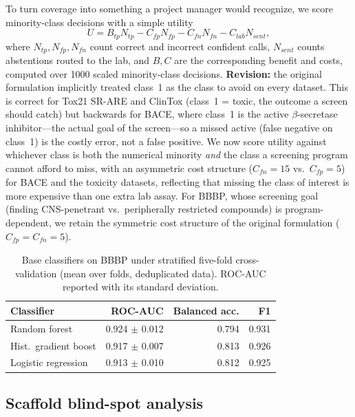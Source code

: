 \documentclass[11pt]{article}
\begin{document}
To turn coverage into something a project manager would recognize, we score minority-class
decisions with a simple utility
\begin{equation}
U = B_{tp} N_{tp} - C_{fp} N_{fp} - C_{fn} N_{fn} - C_{lab} N_{sent}, \label{eq:5}
\end{equation}
where $N_{tp}, N_{fp}, N_{fn}$ count correct and incorrect confident calls, $N_{sent}$ counts
abstentions routed to the lab, and $B, C$ are the corresponding benefit and costs, computed over
1000 scaled minority-class decisions. \textbf{Revision:} the original formulation implicitly
treated class~1 as the class to avoid on every dataset. This is correct for Tox21 SR-ARE and
ClinTox (class~1 = toxic, the outcome a screen should catch) but backwards for BACE, where class~1
is the active $\beta$-secretase inhibitor---the actual goal of the screen---so a missed active
(false negative on class~1) is the costly error, not a false positive. We now score utility against
whichever class is both the numerical minority \emph{and} the class a screening program cannot
afford to miss, with an asymmetric cost structure ($C_{fn}=15$ vs.\ $C_{fp}=5$) for BACE and the
toxicity datasets, reflecting that missing the class of interest is more expensive than one extra
lab assay. For BBBP, whose screening goal (finding CNS-penetrant vs.\ peripherally restricted
compounds) is program-dependent, we retain the symmetric cost structure of the original
formulation ($C_{fp}=C_{fn}=5$).

\begin{table}[h]
\centering
\caption{Base classifiers on BBBP under stratified five-fold cross-validation (mean over folds,
deduplicated data). ROC-AUC reported with its standard deviation.}
\label{tab:table2}
\begin{tabular}{lrrr}
\toprule
Classifier & ROC-AUC & Balanced acc. & F1 \\
\midrule
Random forest & 0.924 $\pm$ 0.012 & 0.794 & 0.931 \\
Hist.\ gradient boost & 0.917 $\pm$ 0.007 & 0.813 & 0.926 \\
Logistic regression & 0.913 $\pm$ 0.010 & 0.812 & 0.925 \\
\bottomrule
\end{tabular}
\end{table}

\subsection{Scaffold blind-spot analysis}
\end{document}
